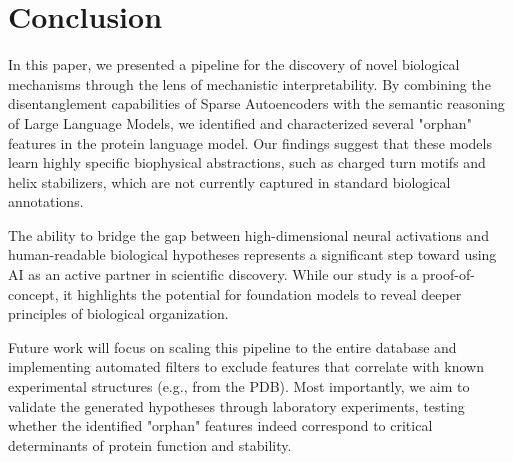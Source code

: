 \section{Conclusion}
\label{sec:conclusion}

In this paper, we presented a pipeline for the discovery of novel biological mechanisms through the lens of mechanistic interpretability. By combining the disentanglement capabilities of Sparse Autoencoders with the semantic reasoning of Large Language Models, we identified and characterized several "orphan" features in the \esm protein language model. Our findings suggest that these models learn highly specific biophysical abstractions, such as charged turn motifs and helix stabilizers, which are not currently captured in standard biological annotations.

The ability to bridge the gap between high-dimensional neural activations and human-readable biological hypotheses represents a significant step toward using AI as an active partner in scientific discovery. While our study is a proof-of-concept, it highlights the potential for foundation models to reveal deeper principles of biological organization.

Future work will focus on scaling this pipeline to the entire \swissprot database and implementing automated filters to exclude features that correlate with known experimental structures (e.g., from the PDB). Most importantly, we aim to validate the generated hypotheses through laboratory experiments, testing whether the identified "orphan" features indeed correspond to critical determinants of protein function and stability.

